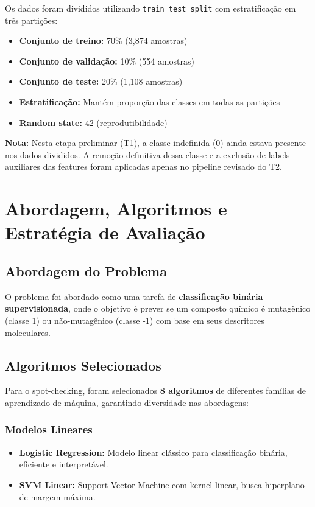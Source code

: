 \documentclass[12pt,a4paper]{article}
\begin{document}
Os dados foram divididos utilizando \texttt{train\_test\_split} com estratificação em três partições:

\begin{itemize}
    \item \textbf{Conjunto de treino:} 70\% (3,874 amostras)
    \item \textbf{Conjunto de validação:} 10\% (554 amostras)
    \item \textbf{Conjunto de teste:} 20\% (1,108 amostras)
    \item \textbf{Estratificação:} Mantém proporção das classes em todas as partições
    \item \textbf{Random state:} 42 (reprodutibilidade)
\end{itemize}

\textbf{Nota:} Nesta etapa preliminar (T1), a classe indefinida (0) ainda estava presente nos dados divididos. A remoção definitiva dessa classe e a exclusão de labels auxiliares das features foram aplicadas apenas no pipeline revisado do T2.

\section{Abordagem, Algoritmos e Estratégia de Avaliação}

\subsection{Abordagem do Problema}

O problema foi abordado como uma tarefa de \textbf{classificação binária supervisionada}, onde o objetivo é prever se um composto químico é mutagênico (classe 1) ou não-mutagênico (classe -1) com base em seus descritores moleculares.

\subsection{Algoritmos Selecionados}

Para o spot-checking, foram selecionados \textbf{8 algoritmos} de diferentes famílias de aprendizado de máquina, garantindo diversidade nas abordagens:

\subsubsection{Modelos Lineares}

\begin{itemize}
    \item \textbf{Logistic Regression:} Modelo linear clássico para classificação binária, eficiente e interpretável.
    \item \textbf{SVM Linear:} Support Vector Machine com kernel linear, busca hiperplano de margem máxima.
\end{itemize}
\end{document}
